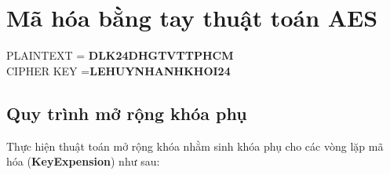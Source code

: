 



\section{Mã hóa bằng tay thuật toán AES}

PLAINTEXT = \textbf{DLK24DHGTVTTPHCM} \\
CIPHER KEY =\textbf{LEHUYNHANHKHOI24}

\subsection{Quy trình mở rộng khóa phụ}

Thực hiện thuật toán mở rộng khóa nhằm sinh khóa phụ cho các vòng lặp mã hóa (\textbf{KeyExpension}) như sau:

